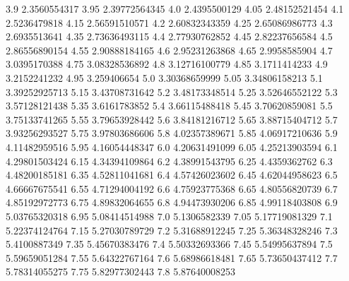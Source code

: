             3.9     2.3560554317
           3.95    2.39772564345
            4.0     2.4395500129
           4.05    2.48152521454
            4.1     2.5236479818
           4.15    2.56591510571
            4.2    2.60832343359
           4.25    2.65086986773
            4.3     2.6935513641
           4.35    2.73636493115
            4.4    2.77930762852
           4.45    2.82237656584
            4.5    2.86556890154
           4.55    2.90888184165
            4.6    2.95231263868
           4.65     2.9958585904
            4.7     3.0395170388
           4.75    3.08328536892
            4.8    3.12716100779
           4.85     3.1711414233
            4.9     3.2152241232
           4.95      3.259406654
            5.0    3.30368659999
           5.05    3.34806158213
            5.1    3.39252925713
           5.15    3.43708731642
            5.2    3.48173348514
           5.25    3.52646552122
            5.3    3.57128121438
           5.35     3.6161783852
            5.4    3.66115488418
           5.45    3.70620859081
            5.5    3.75133741265
           5.55    3.79653928442
            5.6    3.84181216712
           5.65    3.88715404712
            5.7    3.93256293527
           5.75    3.97803686606
            5.8    4.02357389671
           5.85    4.06917210636
            5.9    4.11482959516
           5.95    4.16054448347
            6.0    4.20631491099
           6.05    4.25213903594
            6.1    4.29801503424
           6.15    4.34394109864
            6.2    4.38991543795
           6.25     4.4359362762
            6.3    4.48200185181
           6.35    4.52811041681
            6.4    4.57426023602
           6.45    4.62044958623
            6.5    4.66667675541
           6.55    4.71294004192
            6.6    4.75923775368
           6.65    4.80556820739
            6.7    4.85192972773
           6.75    4.89832064655
            6.8    4.94473930206
           6.85    4.99118403808
            6.9    5.03765320318
           6.95    5.08414514988
            7.0     5.1306582339
           7.05    5.17719081329
            7.1    5.22374124764
           7.15    5.27030789729
            7.2    5.31688912245
           7.25    5.36348328246
            7.3     5.4100887349
           7.35    5.45670383476
            7.4    5.50332693366
           7.45    5.54995637894
            7.5    5.59659051284
           7.55    5.64322767164
            7.6    5.68986618481
           7.65    5.73650437412
            7.7    5.78314055275
           7.75    5.82977302443
            7.8    5.87640008253
